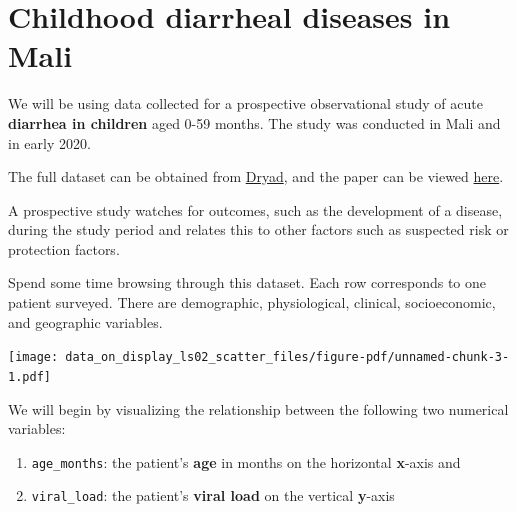 \documentclass[
  letterpaper,
  DIV=11,
  numbers=noendperiod]{scrreprt}
\providecommand{\tightlist}{%
  \setlength{\itemsep}{0pt}\setlength{\parskip}{0pt}}\usepackage{longtable,booktabs,array}
\begin{document}
\hypertarget{childhood-diarrheal-diseases-in-mali}{%
\section{Childhood diarrheal diseases in
Mali}\label{childhood-diarrheal-diseases-in-mali}}

We will be using data collected for a prospective observational study of
acute \textbf{diarrhea in children} aged 0-59 months. The study was
conducted in Mali and in early 2020.

The full dataset can be obtained from
\href{https://doi.org/10.5061/dryad.0rxwdbs19}{Dryad}, and the paper can
be viewed \href{https://elifesciences.org/articles/72294}{here}.

\begin{tcolorbox}[enhanced jigsaw, colframe=quarto-callout-note-color-frame, rightrule=.15mm, opacityback=0, breakable, coltitle=black, colbacktitle=quarto-callout-note-color!10!white, bottomrule=.15mm, leftrule=.75mm, toprule=.15mm, arc=.35mm, bottomtitle=1mm, colback=white, left=2mm, opacitybacktitle=0.6, titlerule=0mm, title=\textcolor{quarto-callout-note-color}{\faInfo}\hspace{0.5em}{Vocab}, toptitle=1mm]

A prospective study watches for outcomes, such as the development of a
disease, during the study period and relates this to other factors such
as suspected risk or protection factors.

\end{tcolorbox}

Spend some time browsing through this dataset. Each row corresponds to
one patient surveyed. There are demographic, physiological, clinical,
socioeconomic, and geographic variables.

\texttt{[image: data\_on\_display\_ls02\_scatter\_files/figure-pdf/unnamed-chunk-3-1.pdf]}

We will begin by visualizing the relationship between the following two
numerical variables:

\begin{enumerate}
\def\labelenumi{\arabic{enumi}.}
\tightlist
\item
  \texttt{age\_months}: the patient's \textbf{age} in months on the
  horizontal \textbf{x}-axis and
\item
  \texttt{viral\_load}: the patient's \textbf{viral load} on the
  vertical \textbf{y}-axis
\end{enumerate}
\end{document}
